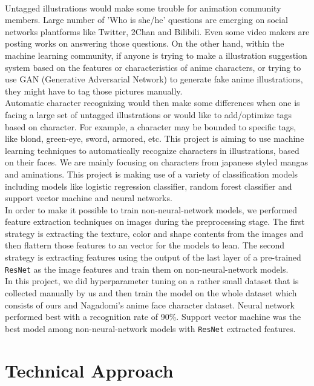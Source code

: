 \documentclass[11.5pt]{article}
\begin{document}
    \\ 
    Untagged illustrations would make some trouble for animation community members.
    Large number of 'Who is she/he' questions are emerging on social networks plantforms like Twitter, 2Chan and Bilibili.
    Even some video makers are posting works on answering those questions.
    On the other hand, within the machine learning community, if anyone is trying to make a illustration suggestion system based on the features or characteristics of anime characters, or trying to use GAN (Generative Adversarial Network) to generate fake anime illustrations, they might have to tag those pictures manually.\\ 
    Automatic character recognizing would then make some differences when one is facing a large set of untagged illustrations or would like to add/optimize tags based on character. For example, a character may be bounded to specific tags, like blond, green-eye, sword, armored, etc.
    This project is aiming to use machine learning techniques to automatically recognize characters in illustrations, based on their faces. We are mainly focusing on characters from japanese styled mangas and aminations. This project is making use of a variety of classification models including models like logistic regression classifier, random forest classifier and support vector machine and neural networks.\\ 
    In order to make it possible to train non-neural-network models, we performed feature extraction techniques on images during the preprocessing stage. The first strategy is extracting the texture, color and shape contents from the images and then flattern those features to an vector for the models to lean. The second strategy is extracting features using the output of the last layer of a pre-trained \texttt{ResNet}\cite{resnet} as the image features and train them on non-neural-network models.\\ 
    In this project, we did hyperparameter tuning on a rather small dataset that is collected manually by us and then train the model on the whole dataset which consists of ours and Nagadomi's anime face character dataset\cite{dataset}. Neural network performed best with a recognition rate of 90\%. Support vector machine was the best model among non-neural-network models with \texttt{ResNet}\cite{resnet} extracted features. 


    \section{Technical Approach}
\end{document}
